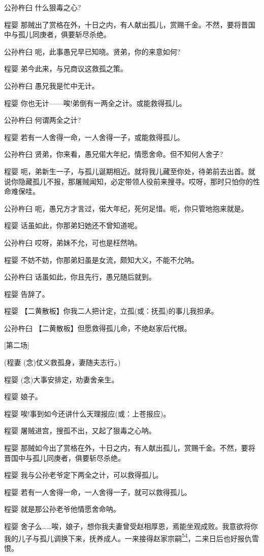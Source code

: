 公孙杵臼 什么狠毒之心?

程婴
那贼出了赏格在外，十日之内，有人献出孤儿，赏赐千金。不然，要将晋国中与孤儿同庚者，俱要斩尽杀绝。

公孙杵臼 呃，此事愚兄早已知晓。贤弟，你的来意如何?

程婴 弟今此来，与兄商议这救孤之策。

公孙杵臼 愚兄我是忙中无计。

程婴 你也无计------唉!弟倒有一两全之计。或能救得孤儿。

公孙杵臼 何谓两全之计?

程婴 若有一人舍得一命，一人舍得一子，或能救得孤儿。

公孙杵臼 贤弟，你来看，愚兄偌大年纪，情愿舍命。但不知何人舍子?

程婴
呃，弟新生一子，与孤儿诞期相近。就将我儿藏至你处，待弟前去出首。就说你隐藏孤儿不报，那屠贼闻知，必定带领人役前来搜寻。哎呀，那时只怕你的性命难保哇。

公孙杵臼 呃，愚兄方才言过，偌大年纪，死何足惜。呃，你只管地抱来就是。

程婴 话虽如此，你那弟妇她还不曾知道呢。

公孙杵臼 哎呀，弟妹不允，可也是枉然呐。

程婴 不妨不妨，你那弟妇虽是女流，颇知大义，不能不允呐。

公孙杵臼 话虽如此，你且先行，愚兄随后就到。

程婴 告辞了。

程婴 【二黄散板】你我二人把计定，立孤(或：抚孤)的事儿我担承。

公孙杵臼 【二黄散板】但愿救得孤儿命，不绝赵家后代根。

{[}第二场{]}

(程妻 (念)仗义救孤身，妻随夫志行。)

程婴 (念)大事安排定，劝妻舍亲生。

程婴 娘子。

程婴 唉!事到如今还讲什么天理报应(或：上苍报应)。

程婴 屠贼进宫，搜孤不出，又起了狠毒之心呐。

程婴
那贼如今出了赏格在外，十日之内，有人献出孤儿，赏赐千金。不然，要将晋国中与孤儿同庚者，俱要斩尽杀绝。

程婴 我与公孙老爷定下两全之计，可以救得孤儿。

程婴 若有一人舍得一命，一人舍得一子，就可以救得孤儿。

程婴 就是那公孙老爷他情愿舍命呐。

程婴
舍子么\ldots{}\ldots{}唉，娘子，想你我夫妻曾受赵相厚恩，焉能坐观成败。我意欲将你我的儿子与孤儿调换下来，抚养成人。一来接得赵家宗嗣\protect\hyperlink{fn54}{\textsuperscript{54}}，二来日后也好报仇雪恨。

